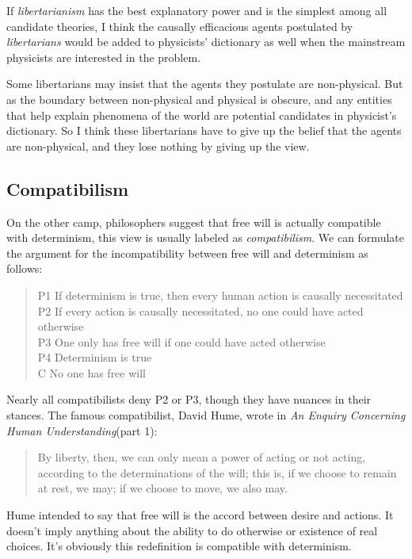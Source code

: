 If \emph{libertarianism} has the best explanatory power and is the simplest among all candidate theories, I think the causally efficacious agents postulated by \emph{libertarians} would be added to physicists' dictionary as well when the mainstream physicists are interested in the problem.

Some libertarians may insist that the agents they postulate are non-physical. But as the boundary between non-physical and physical is obscure, and any entities that help explain phenomena of the world are potential candidates in physicist's dictionary. So I think these libertarians have to give up the belief that the agents are non-physical, and they lose nothing by giving up the view.

\subsection{Compatibilism}

On the other camp, philosophers suggest that free will is actually compatible with determinism, this view is usually labeled as \emph{compatibilism}\cite{sep-compatibilism}. We can formulate the argument for the incompatibility between free will and determinism as follows:

\begin{quote}
P1 If determinism is true, then every human action is causally necessitated \\
P2 If every action is causally necessitated, no one could have acted otherwise \\
P3 One only has free will if one could have acted otherwise \\
P4 Determinism is true \\
C No one has free will
\end{quote}

Nearly all compatibilists deny P2 or P3, though they have nuances in their stances. The famous compatibilist, David Hume, wrote in \emph{An Enquiry Concerning Human Understanding}(part 1):

\begin{quote}
By liberty, then, we can only mean a power of acting or not acting, according to the determinations of the will; this is, if we choose to remain at rest, we may; if we choose to move, we also may.
\end{quote}

Hume intended to say that free will is the accord between desire and actions. It doesn't imply anything about the ability to do otherwise or existence of real choices. It's obviously this redefinition is compatible with determinism.

